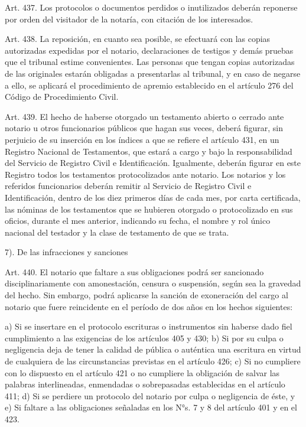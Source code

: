    Art. 437. Los protocolos o documentos perdidos o inutilizados deberán reponerse por orden del visitador de la notaría, con citación de los interesados.


    Art. 438. La reposición, en cuanto sea posible, se efectuará con las copias autorizadas expedidas por el notario, declaraciones de testigos y demás pruebas que el tribunal estime convenientes.
    Las personas que tengan copias autorizadas de las originales estarán obligadas a presentarlas al tribunal, y en caso de negarse a ello, se aplicará el procedimiento de apremio establecido en el artículo 276 del Código de Procedimiento Civil.


    Art. 439. El hecho de haberse otorgado un testamento abierto o cerrado ante notario u otros funcionarios públicos que hagan sus veces, deberá figurar, sin perjuicio de su inserción en los índices a que se refiere el artículo 431, en un Registro Nacional de Testamentos, que estará a cargo y bajo la responsabilidad del Servicio de Registro Civil e Identificación. Igualmente, deberán figurar en este Registro todos los testamentos protocolizados ante notario.
    Los notarios y los referidos funcionarios deberán remitir al Servicio de Registro Civil e Identificación, dentro de los diez primeros días de cada mes, por carta certificada, las nóminas de los testamentos que se hubieren otorgado o protocolizado en sus oficios, durante el mes anterior, indicando su fecha, el nombre y rol único nacional del testador y la clase de testamento de que se trata.


    7). De las infracciones y sanciones




    Art. 440. El notario que faltare a sus obligaciones podrá ser sancionado disciplinariamente con amonestación, censura o suspensión, según sea la gravedad del hecho.
    Sin embargo, podrá aplicarse la sanción de exoneración del cargo al notario que fuere reincidente en el período de dos años en los hechos siguientes:

    a) Si se insertare en el protocolo escrituras o instrumentos sin haberse dado fiel cumplimiento a las exigencias de los artículos 405 y 430;
    b) Si por su culpa o negligencia deja de tener la calidad de pública o auténtica una escritura en virtud de cualquiera de las circunstancias previstas en el artículo 426;
    c) Si no cumpliere con lo dispuesto en el artículo 421 o no cumpliere la obligación de salvar las palabras interlineadas, enmendadas o sobrepasadas establecidas en el artículo 411;
    d) Si se perdiere un protocolo del notario por culpa o negligencia de éste, y
    e) Si faltare a las obligaciones señaladas en los N°s. 7 y 8 del artículo 401 y en el 423.



